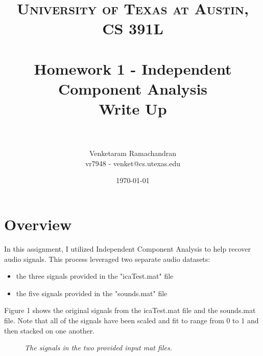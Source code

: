 \documentclass{article} %
\title{	
\normalfont \normalsize 
\textsc{University of Texas at Austin, CS 391L} \\
\horrule{0.6pt} \\[0.4cm] %
\huge Homework 1 - Independent Component Analysis \\[0.4cm]
\large Write Up  \\
\horrule{2pt} \\[0.5cm] %
}
\author{Venketaram Ramachandran\\
vr7948 - venket@cs.utexas.edu} %
\date{\normalsize\today} %
\begin{document}
\maketitle %

\section{Overview}

In this assignment, I utilized Independent Component Analysis to help recover audio signals. This process leveraged two separate audio datasets:

\begin{itemize}
\item the three signals provided in the "icaTest.mat" file 
\item the five signals provided in the "sounds.mat" file 
\end{itemize}

Figure 1 shows the original signals from the icaTest.mat file and the sounds.mat file. Note that all of the signals have been scaled and fit to range from 0 to 1 and then stacked on one another.

\begin{figure}[h]%
	\centering
    	\hfill%
    \caption{\textit{The signals in the two provided input mat files.}}
    \label{fig:default}
\end{figure}
\end{document}
